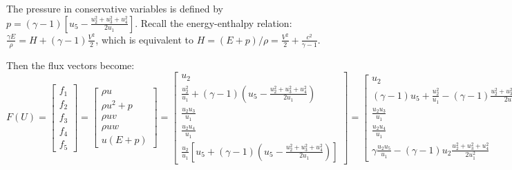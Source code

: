 \documentclass{article}
\begin{document}
The pressure in conservative variables is defined by $p=(\gamma-1)[u_5-\frac{u_2^2+u_3^2+u_4^2}{2u_1} ]$.
Recall the energy-enthalpy relation: $\frac{\gamma E}{\rho} = H+(\gamma-1)\frac{V^2}{2}$, which is equivalent to $H = (E+p)/\rho = \frac{V^2}{2}+\frac{c^2}{\gamma-1}$.

Then the flux vectors become:
\begin{equation}
  F(U) = \left[
    \begin{array}{c}
      f_1 \\
      f_2 \\
      f_3 \\
      f_4 \\
      f_5
    \end{array}
  \right] = \left[
    \begin{array}{c}
      \rho u\\
      \rho u^2 + p\\
      \rho u v\\
      \rho u w\\
      u(E+p)
    \end{array}
  \right] = \left[
    \begin{array}{c}
      u_2\\
      \frac{u_2^2}{u_1} + (\gamma-1) (u_5-\frac{u_2^2+u_3^2+u_4^2}{2u_1})\\
      \frac{u_2 u_3}{u_1}\\
      \frac{u_2 u_4}{u_1}\\
      \frac{u_2}{u_1} [ u_5 + (\gamma-1)(u_5-\frac{u_2^2+u_3^2+u_4^2}{2u_1}) ]
    \end{array}
  \right] = \left[
    \begin{array}{c}
      u_2\\
      (\gamma-1)u_5 + \frac{u_2^2}{u_1} - (\gamma-1)\frac{u_2^2+u_3^2+u_4^2}{2u_1}\\
      \frac{u_2 u_3}{u_1}\\
      \frac{u_2 u_4}{u_1}\\
      \gamma \frac{u_2 u_5}{u_1} - (\gamma-1) u_2 \frac{u_2^2+u_3^2+u_4^2}{2 u_1^2}
    \end{array}
  \right]
\end{equation}
\end{document}
